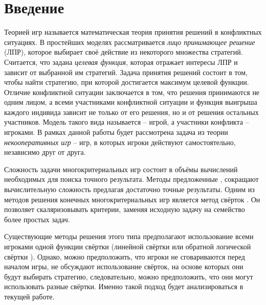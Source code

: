 \section{Введение}

\qquad Теорией игр называется математическая теория принятия решений
в конфликтных ситуациях. В простейших моделях рассматривается \textit{лицо
принимающее решение} (ЛПР), которое выбирает своё действие из некоторого
множества стратегий. Считается, что задана \textit{целевая функция},
которая отражает интересы ЛПР и зависит от выбранной им стратегий.
Задача принятия решений состоит в том, чтобы найти стратегию, 
при которой достигается максимум целевой функции. Отличие конфликтной ситуации
заключается в том, что решения принимаются не одним лицом, 
а всеми участниками конфликтной ситуации и функция выигрыша
каждого индивида зависит не только от его решения, но 
и от решения остальных участников.  Модель такого вида называется --
игрой, а участники конфликта -- игроками. В рамках данной работы
будет рассмотрена задача из теории \textit{некооперативных игр} -- 
игр, в которых игроки действуют самостоятельно, независимо друг 
от друга. 

	Сложность задачи многокритериальных игр состоит в объёмы вычислений
необходимых для поиска точного результата. Методы предложенные \cite{shapley},
\cite{novikova} сокращают вычислительную сложность предлагая 
достаточно точные результаты. Одним из методов решения конечных 
многокритериальных игр является метод свёрток \cite{blackwell}.
Он позволяет скаляризовывать критерии, заменяя исходную задачу на 
семейство более простых задач. 

	Существующие методы решения этого типа предполагают использование всеми игроками одной функции свёртки (линейной свёртки \cite{shapley} или обратной логической свёртки \cite{novikova}). Однако, можно предположить,
что игроки не сговариваются перед началом игры, не обсуждают использование 
свёрток, на основе которых они будут выбирать стратегию, следовательно, можно
предположить, что они могут использовать разные свёртки. Именно такой подход
будет анализироваться в текущей работе.